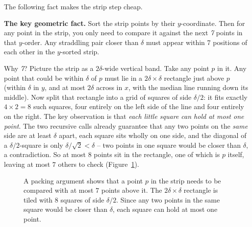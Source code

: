 The following fact makes the strip step cheap.

\begin{focusbox}
\textbf{The key geometric fact.} Sort the strip points by their $y$-coordinate.
Then for any point in the strip, you only need to compare it against the next
\emph{7} points in that $y$-order. Any straddling pair closer than $\delta$ must
appear within 7 positions of each other in the $y$-sorted strip.
\end{focusbox}

Why \emph{7}? Picture the strip as a $2\delta$-wide vertical band. Take any point
$p$ in it. Any point that could be within $\delta$ of $p$ must lie in a
$2\delta \times \delta$ rectangle just above $p$ (within $\delta$ in $y$, and at
most $2\delta$ across in $x$, with the median line running down its middle). Now
split that rectangle into a grid of squares of side $\delta/2$: it fits exactly
$4 \times 2 = 8$ such squares, four entirely on the left side of the line and four
entirely on the right. The key observation is that \emph{each little square
can hold at most one point}. The two recursive calls already guarantee that any
two points on the \emph{same} side are at least $\delta$ apart, each square sits
wholly on one side, and the diagonal of a $\delta/2$-square is only
$\delta/\sqrt{2} < \delta$ -- two points in one square would be closer than
$\delta$, a contradiction. So at most $8$ points sit in the rectangle, one of
which is $p$ itself, leaving at most $7$ others to check (Figure~\ref{ch32:fig-packing}).

\begin{figure}[htbp]
\centering
{}
\caption{A packing argument shows that a point $p$ in the strip needs to be compared with at most $7$ points above it. The $2\delta \times \delta$ rectangle is tiled with $8$ squares of side $\delta/2$. Since any two points in the same square would be closer than $\delta$, each square can hold at most one point.}
\label{ch32:fig-packing}
\end{figure}

